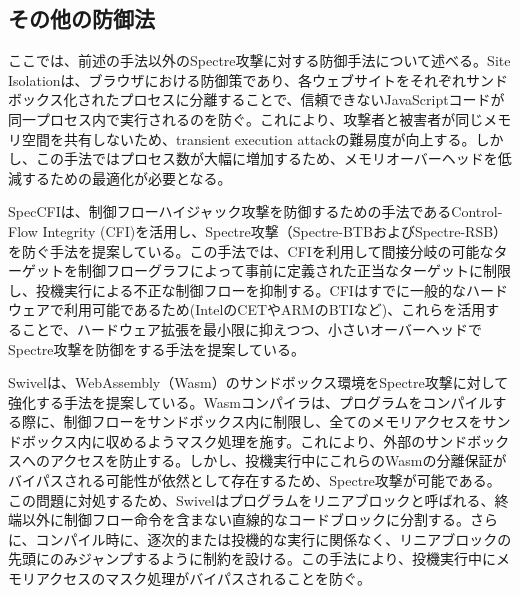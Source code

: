 \subsection{その他の防御法}
ここでは、前述の手法以外のSpectre攻撃に対する防御手法について述べる。Site Isolation\cite{reis2019site}は、ブラウザにおける防御策であり、各ウェブサイトをそれぞれサンドボックス化されたプロセスに分離することで、信頼できないJavaScriptコードが同一プロセス内で実行されるのを防ぐ。これにより、攻撃者と被害者が同じメモリ空間を共有しないため、transient execution attackの難易度が向上する。しかし、この手法ではプロセス数が大幅に増加するため、メモリオーバーヘッドを低減するための最適化が必要となる。

SpecCFI\cite{9152786}は、制御フローハイジャック攻撃を防御するための手法であるControl-Flow Integrity (CFI)を活用し、Spectre攻撃（Spectre-BTBおよびSpectre-RSB）を防ぐ手法を提案している。この手法では、CFIを利用して間接分岐の可能なターゲットを制御フローグラフによって事前に定義された正当なターゲットに制限し、投機実行による不正な制御フローを抑制する。CFIはすでに一般的なハードウェアで利用可能であるため(IntelのCETやARMのBTIなど)、これらを活用することで、ハードウェア拡張を最小限に抑えつつ、小さいオーバーヘッドでSpectre攻撃を防御をする手法を提案している。

Swivel\cite{narayan2021swivel}は、WebAssembly（Wasm）のサンドボックス環境をSpectre攻撃に対して強化する手法を提案している。Wasmコンパイラは、プログラムをコンパイルする際に、制御フローをサンドボックス内に制限し、全てのメモリアクセスをサンドボックス内に収めるようマスク処理を施す。これにより、外部のサンドボックスへのアクセスを防止する。しかし、投機実行中にこれらのWasmの分離保証がバイパスされる可能性が依然として存在するため、Spectre攻撃が可能である。この問題に対処するため、Swivelはプログラムをリニアブロックと呼ばれる、終端以外に制御フロー命令を含まない直線的なコードブロックに分割する。さらに、コンパイル時に、逐次的または投機的な実行に関係なく、リニアブロックの先頭にのみジャンプするように制約を設ける。この手法により、投機実行中にメモリアクセスのマスク処理がバイパスされることを防ぐ。



